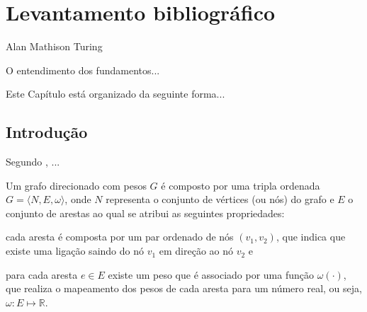 
\chapter{Levantamento bibliográfico}
\label{cap:2:fundamentacao}

{Alan Mathison Turing}

O entendimento dos fundamentos...

Este Capítulo está organizado da seguinte forma...

\section{Introdução}
\label{sec:2:introducao}

Segundo \citet{brassard1996fundamentals}, ...

\begin{definicao}\label{def:grafo}
%
%
\citep{cormen2009algorithms}
Um grafo direcionado com pesos $G$ é composto por uma tripla ordenada
$G=\langle N, E, \omega \rangle$, onde $N$ representa o conjunto de vértices
(ou nós) do grafo e $E$ o conjunto de arestas ao qual se atribui as seguintes
propriedades:
\begin{inparaenum}[(i)]
\item cada aresta é composta por um par ordenado de nós $(v_1,v_2)$, que
    indica que existe uma ligação saindo do nó $v_1$ em direção ao nó $v_2$ e
\item para cada aresta $e \in E$ existe um peso que é associado por uma
    função $\omega(\cdot)$, que realiza o mapeamento dos pesos de cada aresta
    para um número real, ou seja, $\omega \colon E\mapsto\mathbb{R}$.
\end{inparaenum}
\end{definicao}

